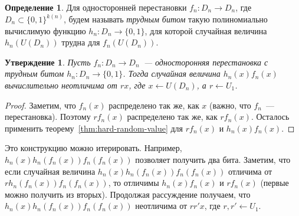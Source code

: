 \documentclass[12pt]{article}
\newcommand{\bits}{\{0,1\}}
\theoremstyle{definition}
\newtheorem{definition}{Определение}[section]
\theoremstyle{plain}
\newtheorem{statement}{Утверждение}[section]
\theoremstyle{remark}
\begin{document}
\begin{definition}
Для односторонней перестановки $f_n: D_n\to D_n$, где $D_n\subset\bits^{k(n)}$,
будем называть \emph{трудным битом} такую полиномиально вычислимую функцию $h_n: D_n\to\bits$,
для которой случайная величина
$h_n(U(D_n))$ трудна для $f_n(U(D_n))$. 
\end{definition}

\begin{statement}
Пусть $f_n:D_n\to D_n$~--- односторонняя перестановка с трудным битом $h_n: D_n\to\bits$.
Тогда случайная величина $h_n(x)f_n(x)$ вычислительно неотличима от $r x$, где $x\gets U(D_n)$,
а $r\gets U_1$.
\end{statement}
\begin{proof}
Заметим, что $f_n(x)$ распределено так же, как $x$ (важно, что $f_n$~--- перестановка). Поэтому
$r f_n(x)$ распределено так же, как $r f_n(x)$. Осталось применить теорему~\ref{thm:hard-random-value}
для $r f_n(x)$ и $h_n(x)f_n(x)$.
\end{proof}

Это конструкцию можно итерировать. Например, $h_n(x) h_n(f_n(x)) f_n(f_n(x))$ позволяет получить 
два бита. Заметим, что если случайная величина $h_n(x) h_n(f_n(x)) f_n(f_n(x))$ отличима 
от $r h_n(f_n(x)) f_n(f_n(x))$, то отличимы $h_n(x) f_n(x)$ и $r f_n(x)$ (первые можно получить из вторых).
Продолжая рассуждение получаем, что $h_n(x) h_n(f_n(x)) f_n(f_n(x))$ неотличима от $rr'x$, где $r,r'\gets U_1$.
\end{document}
